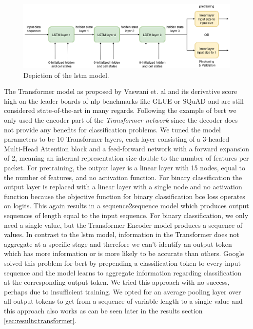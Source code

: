 \begin{figure}[h]
	\centering
	\includegraphics[width=0.95\linewidth]{graphics/img/lstm_model.png}
	\caption{Depiction of the \gls{lstm} model.}
	\label{fig:lstm_model}
\end{figure}

The Transformer model as proposed by Vaswani et. al \cite{attention} and its derivative score high on the leader boards of \gls{nlp} benchmarks like GLUE \cite{glue} or SQuAD \cite{bibid} and are still considered state-of-the-art in many regards. Following the example of \gls{bert} we only used the encoder part of the \textit{Transformer network} since the decoder does not provide any benefits for classification problems. We tuned the model parameters to be 10 Transformer layers, each layer consisting of a 3-headed Multi-Head Attention block and a feed-forward network with a forward expansion of 2, meaning an internal representation size double to the number of features per packet. For pretraining, the output layer is a linear layer with 15 nodes, equal to the number of features, and no activation function. For binary classification the output layer is replaced with a linear layer with a single node and no activation function because the objective function for binary classification \gls{bce} loss operates on logits. This again results in a sequence2sequence model which produces output sequences of length equal to the input sequence. For binary classification, we only need a single value, but the Transformer Encoder model produces a sequence of values. In contrast to the \gls{lstm} model, information in the Transformer does not aggregate at a specific stage and therefore we can't identify an output token which has more information or is more likely to be accurate than others. Google solved this problem for \gls{bert} by prepending a classification token to every input sequence and the model learns to aggregate information regarding classification at the corresponding output token. We tried this approach with no success, perhaps due to insufficient training. We opted for an average pooling layer over all output tokens to get from a sequence of variable length to a single value and this approach also works as can be seen later in the results section \ref{sec:results:transformer}.

